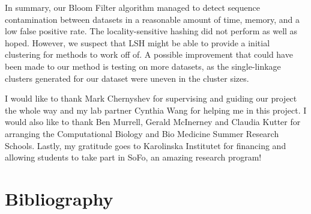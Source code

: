 \documentclass[times, twoside, watermark]{zHenriquesLab-StyleBioRxiv}
\begin{document}
In summary, our Bloom Filter algorithm managed to detect sequence contamination between datasets in a reasonable amount of time, memory, and a low false positive rate. The locality-sensitive hashing did not perform as well as hoped. However, we suspect that LSH might be able to provide a initial clustering for methods to work off of. A possible improvement that could have been made to our method is testing on more datasets, as the single-linkage clusters generated for our dataset were uneven in the cluster sizes. 

\begin{acknowledgements}
I would like to thank Mark Chernyshev for supervising and guiding our project the whole way and my lab partner Cynthia Wang for helping me in this project. I would also like to thank Ben Murrell, Gerald McInerney and Claudia Kutter for arranging the Computational Biology and Bio Medicine Summer Research Schools. Lastly, my gratitude goes to Karolinska Institutet for financing and allowing students to take part in SoFo, an amazing research program!
\end{acknowledgements}

\section*{Bibliography}



\onecolumn
\cleardoublepage


\captionsetup*{format=largeformat}

\end{document}
